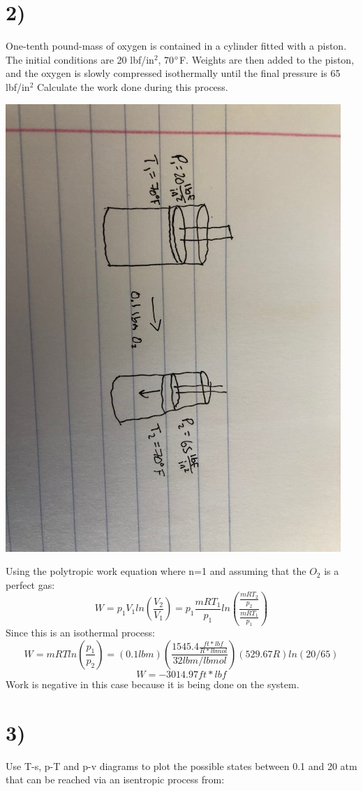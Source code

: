 \documentclass[preview,12pt]{article}
\begin{document}
\section*{2)}
One-tenth pound-mass of oxygen is contained in a cylinder fitted with a piston. The initial conditions are 20 lbf/in$^2$, 70$\degree$F. Weights are then added to the piston, and the oxygen is slowly compressed isothermally until the final pressure is 65 lbf/in$^2$ Calculate the work done during this process.

    \begin{center}
    \includegraphics[width=.75\textwidth, angle =90 ]{Problem 2.jpg}
    \end{center}
    Using the polytropic work equation where n=1 and assuming that the $O_2$ is a perfect gas:
    $$W=p_1V_1ln(\frac{V_2}{V_1})=p_1\frac{mRT_1}{p_1}ln\left(\frac{\frac{mRT_2}{p_2}}{\frac{mRT_1}{p_1}}\right)$$
    Since this is an isothermal process:
    $$W=mRTln\left(\frac{p_1}{p_2}\right)=(0.1lbm)\left(\frac{1545.4\frac{ft* lbf}{R*lbmol}}{32lbm/lbmol}\right)(529.67 R)ln(20/65)$$
    $$W=-3014.97ft*lbf$$
    Work is negative in this case because it is being done on the system.
    
\section*{3)}
    Use T-s, p-T and p-v diagrams to plot the possible states between 0.1 and 20 atm that can be reached via an isentropic process from: 
    
\end{document}
